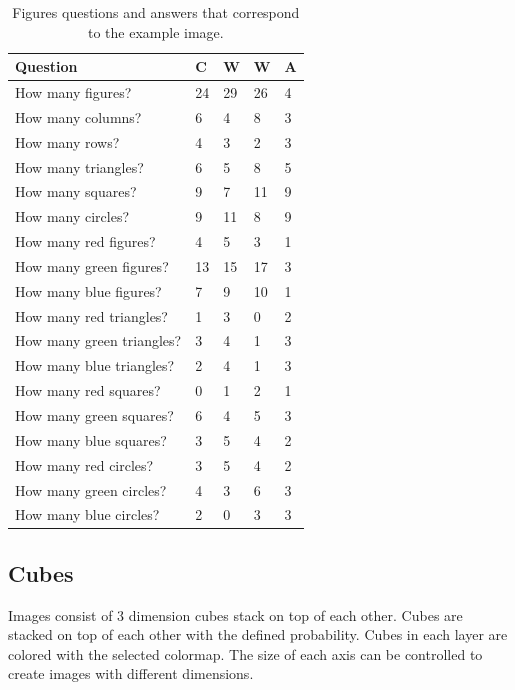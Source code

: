 \documentclass[11pt]{article}
\begin{document}
\begin{table}[ht]
\centering
\begin{tabular}{lllll}
\toprule
Question                  & C       & W     & W & A    \\ \midrule
How many figures?         & 24      & 29     & 26 & 4    \\
How many columns?          & 6       & 4      & 8 & 3     \\
How many rows?            & 4       & 3      & 2 & 3  \\ \midrule
How many triangles?       & 6       & 5      & 8 & 5      \\
How many squares?         & 9       & 7      & 11 & 9     \\
How many circles?         & 9       & 11     & 8 & 9      \\ \midrule
How many red figures?     & 4       & 5      & 3 & 1      \\
How many green figures?   & 13      & 15     & 17 & 3     \\
How many blue figures?    & 7       & 9      & 10 & 1     \\ \midrule
How many red triangles?   & 1       & 3      & 0 & 2      \\ 
How many green triangles? & 3       & 4      & 1 & 3      \\
How many blue triangles?  & 2       & 4      & 1 & 3      \\
How many red squares?     & 0       & 1      & 2 & 1      \\
How many green squares?   & 6       & 4      & 5 & 3      \\
How many blue squares?    & 3       & 5      & 4 & 2      \\
How many red circles?     & 3       & 5      & 4 & 2      \\
How many green circles?   & 4       & 3      & 6 & 3      \\
How many blue circles?    & 2       & 0      & 3 & 3      \\ \bottomrule
\end{tabular}
\caption{Figures questions and answers that correspond to the example image.}
\label{tab:figures_example}
\end{table}

\subsection{Cubes}

Images consist of 3 dimension cubes stack on top of each other. Cubes are stacked on top of each other with the defined probability. Cubes in each layer are colored with the selected colormap. The size of each axis can be controlled to create images with different dimensions. 
\end{document}
